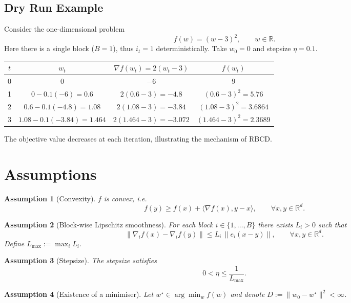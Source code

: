 \documentclass{article}
\newtheorem{assumption}{Assumption}
\newcommand{\R}{\mathbb{R}}
\begin{document}
\subsection*{Dry Run Example}
Consider the one‑dimensional problem
\[
f(w)=(w-3)^{2},\qquad w\in\R .
\]
Here there is a single block ($B=1$), thus $i_{t}=1$ deterministically.
Take $w_{0}=0$ and stepsize $\eta=0.1$.

\begin{center}
\begin{tabular}{c|c|c|c}
$t$ & $w_{t}$ & $\nabla f(w_{t})=2(w_{t}-3)$ & $f(w_{t})$ \\\hline
0 & $0$ & $-6$ & $9$ \\
1 & $0-0.1(-6)=0.6$ & $2(0.6-3)=-4.8$ & $(0.6-3)^{2}=5.76$ \\
2 & $0.6-0.1(-4.8)=1.08$ & $2(1.08-3)=-3.84$ & $(1.08-3)^{2}=3.6864$ \\
3 & $1.08-0.1(-3.84)=1.464$ & $2(1.464-3)=-3.072$ & $(1.464-3)^{2}=2.3689$
\end{tabular}
\end{center}
The objective value decreases at each iteration, illustrating the
mechanism of RBCD.

\section*{Assumptions}

\begin{assumption}[Convexity]
\label{as:convex}
$f$ is convex, i.e.
\[
f(y)\ge f(x)+\langle\nabla f(x),y-x\rangle,\qquad\forall x,y\in\R^{d}.
\]
\end{assumption}

\begin{assumption}[Block‑wise Lipschitz smoothness]
\label{as:smooth}
For each block $i\in\{1,\dots ,B\}$ there exists $L_{i}>0$ such that
\[
\bigl\|\nabla_{i}f(x)-\nabla_{i}f(y)\bigr\|
\le L_{i}\,\|e_{i}(x-y)\|,\qquad\forall x,y\in\R^{d}.
\]
Define $L_{\max}:=\max_{i}L_{i}$.
\end{assumption}

\begin{assumption}[Stepsize]
\label{as:stepsize}
The stepsize satisfies
\[
0<\eta\le\frac{1}{L_{\max}} .
\]
\end{assumption}

\begin{assumption}[Existence of a minimiser]
\label{as:opt}
Let $w^{\star}\in\arg\min_{w}f(w)$ and denote $D:=\|w_{0}-w^{\star}\|^{2}<\infty$.
\end{assumption}
\end{document}
